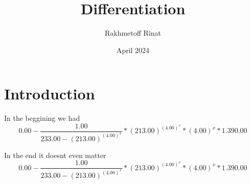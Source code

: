 \documentclass{article}
\title{Differentiation}
\author{Rakhmetoff Rinat }
\date{April 2024}
\begin{document}
\maketitle
\section{Introduction}
In the beggining we had
\begin {equation}
0.00 - \frac {1.00} {233.00 - (213.00) ^ {(4.00) ^ {x}}} * (213.00) ^ {(4.00) ^ {x}} * (4.00) ^ {x} * 1.39 0.00
\end {equation}


In the end it doesnt even matter
\begin {equation}
0.00 - \frac {1.00} {233.00 - (213.00) ^ {(4.00) ^ {x}}} * (213.00) ^ {(4.00) ^ {x}} * (4.00) ^ {x} * 1.39 0.00
\end {equation}
\end{document}
